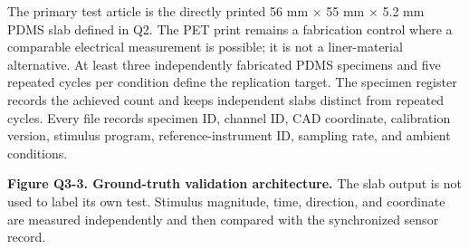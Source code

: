 \clearpage
{}

\hypertarget{q3-ground-truth}{}

{\fontsize{9.55}{11.3}\selectfont
The primary test article is the directly printed 56 mm $\times$ 55 mm
$\times$ 5.2 mm PDMS slab defined in Q2. The PET print remains a fabrication
control where a comparable electrical measurement is possible; it is not a
liner-material alternative. At least three independently fabricated PDMS
specimens and five repeated cycles per condition define the replication target.
The specimen register records the achieved count and keeps independent slabs
distinct from repeated cycles.
Every file records specimen ID, channel ID, CAD coordinate, calibration
version, stimulus program, reference-instrument ID, sampling rate, and ambient
conditions.\par}

\begin{center}
\end{center}

{\fontsize{8.2}{9.5}\selectfont\color{AUBGray}
\textbf{Figure Q3-3. Ground-truth validation architecture.} The slab output is
not used to label its own test. Stimulus magnitude, time, direction, and
coordinate are measured independently and then compared with the synchronized
sensor record.\par}

